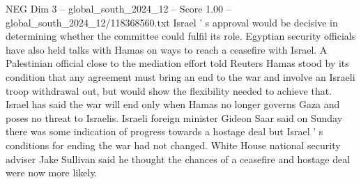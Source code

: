 \begin{textsample}{NEG Dim 3 – global\_south\_2024\_12 – Score 1.00 – global\_south\_2024\_12/118368560.txt}
Israel ' s approval would be decisive in determining whether the committee could fulfil its role.
Egyptian security officials have also held talks with Hamas on ways to reach a ceasefire with Israel.
A Palestinian official close to the mediation effort told Reuters Hamas stood by its condition that any agreement must bring an end to the war and involve an Israeli troop withdrawal out, but would show the flexibility needed to achieve that.
Israel has said the war will end only when Hamas no longer governs Gaza and poses no threat to Israelis.
Israeli foreign minister Gideon Saar said on Sunday there was some indication of progress towards a hostage deal but Israel ' s conditions for ending the war had not changed.
White House national security adviser Jake Sullivan said he thought the chances of a ceasefire and hostage deal were now more likely.

\end{textsample}
